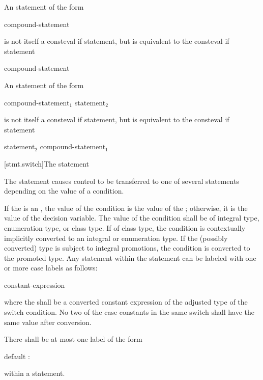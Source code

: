 \pnum
An  statement of the form
\begin{ncsimplebnf}
 \terminal{!}  compound-statement
\end{ncsimplebnf}
is not itself a consteval if statement,
but is equivalent to the consteval if statement
\begin{ncsimplebnf}
  \terminal{\{} \terminal{\}}  compound-statement
\end{ncsimplebnf}
An  statement of the form
\begin{ncsimplebnf}
 \terminal{!}  compound-statement$_1$  statement$_2$
\end{ncsimplebnf}
is not itself a consteval if statement,
but is equivalent to the consteval if statement
\begin{ncsimplebnf}
  statement$_2$  compound-statement$_1$
\end{ncsimplebnf}

[stmt.switch]{The  statement}%

\pnum
The  statement causes control to be transferred to one of
several statements depending on the value of a condition.

\pnum
If the  is an ,
the value of the condition is the value of the ;
otherwise, it is the value of the decision variable.
The value of the condition shall be of integral type, enumeration type, or class
type. If of class type, the
condition is contextually implicitly converted to
an integral or enumeration type.
If the (possibly converted) type is subject to integral
promotions, the condition is converted
to the promoted type.
Any
statement within the  statement can be labeled with one or
more case labels as follows:
\begin{ncbnf}
%
 constant-expression \terminal{:}
\end{ncbnf}
where the  shall be
a converted constant expression of the
adjusted type of the switch condition. No two of the case constants in
the same switch shall have the same value after conversion.

\pnum
{}%
There shall be at most one label of the form
\begin{codeblock}
default :
\end{codeblock}
within a  statement.

